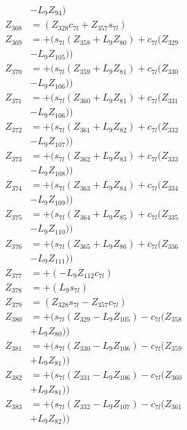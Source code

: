 \begin{multicols}{2}
\begin{align}
&- L_9Z_{94}) \nonumber \\
Z_{368} &= (Z_{328}c_{7l} + Z_{357}s_{7l}) \nonumber \\
Z_{369} &= + (s_{7l}(Z_{358} + L_9Z_{80}) + c_{7l}(Z_{329}  \nonumber \\
&- L_9Z_{105})) \nonumber \\
Z_{370} &= + (s_{7l}(Z_{359} + L_9Z_{81}) + c_{7l}(Z_{330}  \nonumber \\
&- L_9Z_{106})) \nonumber \\
Z_{371} &= + (s_{7l}(Z_{360} + L_9Z_{81}) + c_{7l}(Z_{331}  \nonumber \\
&- L_9Z_{106})) \nonumber \\
Z_{372} &= + (s_{7l}(Z_{361} + L_9Z_{82}) + c_{7l}(Z_{332}  \nonumber \\
&- L_9Z_{107})) \nonumber \\
Z_{373} &= + (s_{7l}(Z_{362} + L_9Z_{83}) + c_{7l}(Z_{333}  \nonumber \\
&- L_9Z_{108})) \nonumber \\
Z_{374} &= + (s_{7l}(Z_{363} + L_9Z_{84}) + c_{7l}(Z_{334}  \nonumber \\
&- L_9Z_{109})) \nonumber \\
Z_{375} &= + (s_{7l}(Z_{364} + L_9Z_{85}) + c_{7l}(Z_{335}  \nonumber \\
&- L_9Z_{110})) \nonumber \\
Z_{376} &= + (s_{7l}(Z_{365} + L_9Z_{86}) + c_{7l}(Z_{336}  \nonumber \\
&- L_9Z_{111})) \nonumber \\
Z_{377} &= + (-L_9Z_{112}c_{7l}) \nonumber \\
Z_{378} &= + (L_9s_{7l}) \nonumber \\
Z_{379} &= (Z_{328}s_{7l} - Z_{357}c_{7l}) \nonumber \\
Z_{380} &= + (s_{7l}(Z_{329} - L_9Z_{105}) - c_{7l}(Z_{358}  \nonumber \\
&+ L_9Z_{80})) \nonumber \\
Z_{381} &= + (s_{7l}(Z_{330} - L_9Z_{106}) - c_{7l}(Z_{359}  \nonumber \\
&+ L_9Z_{81})) \nonumber \\
Z_{382} &= + (s_{7l}(Z_{331} - L_9Z_{106}) - c_{7l}(Z_{360}  \nonumber \\
&+ L_9Z_{81})) \nonumber \\
Z_{383} &= + (s_{7l}(Z_{332} - L_9Z_{107}) - c_{7l}(Z_{361}  \nonumber \\
&+ L_9Z_{82})) \nonumber \\

\end{align}
\end{multicols}
